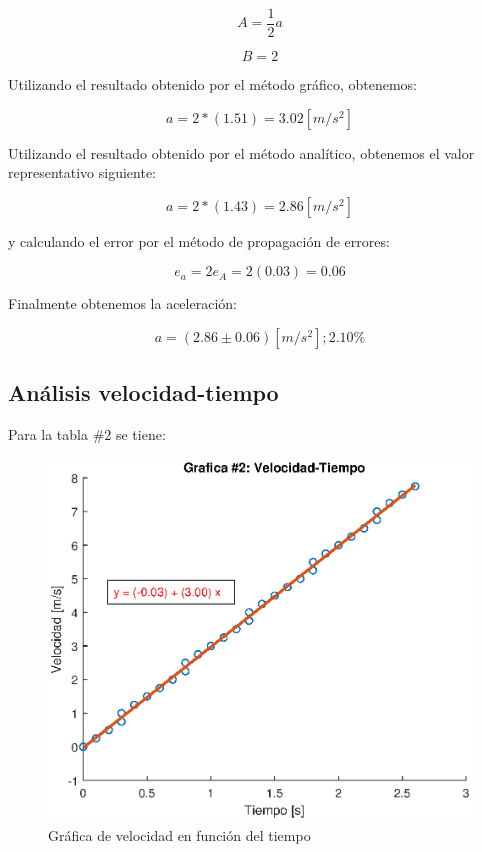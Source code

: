 \documentclass[letter,11pt]{article}
\begin{document}
\begin{equation*}
    A = \frac{1}{2} a
\end{equation*}

\begin{equation*}
    B = 2
\end{equation*}

Utilizando el resultado obtenido por el método gráfico, obtenemos:

\begin{equation}
    a = 2 * (1.51) = 3.02 [m/s^2]
\end{equation}

Utilizando el resultado obtenido por el método analítico, obtenemos el valor
representativo siguiente:

\begin{equation*}
    a = 2 * (1.43) = 2.86 [m/s^2]
\end{equation*}

y calculando el error por el método de propagación de errores:

\begin{equation*}
    e_a = 2 e_A = 2 (0.03) = 0.06
\end{equation*}

Finalmente obtenemos la aceleración:

\begin{equation}
    a = (2.86 \pm 0.06)[m/s^2];2.10\%
\end{equation}

\subsection{Análisis velocidad-tiempo}
Para la tabla \#2 se tiene:

\begin{figure}[!h]
\centering
\includegraphics[scale=1.00]{eps/6.2.1.eps}
\caption{Gráfica de velocidad en función del tiempo}
\label{practica63}
\end{figure}
\end{document}
